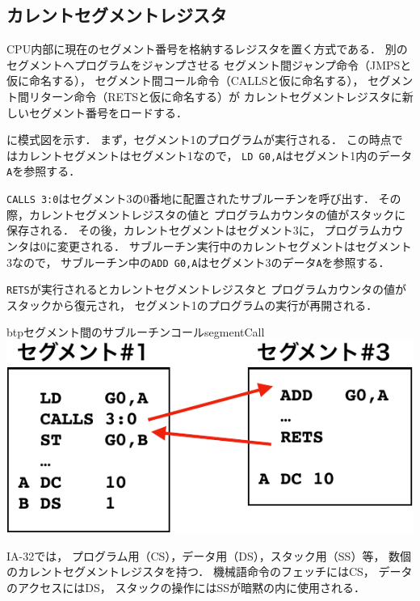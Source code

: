 \subsection{カレントセグメントレジスタ}
CPU内部に現在のセグメント番号を格納するレジスタを置く方式である．
別のセグメントへプログラムをジャンプさせる
セグメント間ジャンプ命令（JMPSと仮に命名する），
セグメント間コール命令（CALLSと仮に命名する），
セグメント間リターン命令（RETSと仮に命名する）が
カレントセグメントレジスタに新しいセグメント番号をロードする．

に模式図を示す．
まず，セグメント1のプログラムが実行される．
この時点ではカレントセグメントはセグメント1なので，
\texttt{LD G0,A}はセグメント1内のデータ\texttt{A}を参照する．

\texttt{CALLS 3:0}はセグメント3の0番地に配置されたサブルーチンを呼び出す．
その際，カレントセグメントレジスタの値と
プログラムカウンタの値がスタックに保存される．
その後，カレントセグメントはセグメント3に，
プログラムカウンタは0に変更される．
サブルーチン実行中のカレントセグメントはセグメント3なので，
サブルーチン中の\texttt{ADD G0,A}はセグメント3のデータ\texttt{A}を参照する．

\texttt{RETS}が実行されるとカレントセグメントレジスタと
プログラムカウンタの値がスタックから復元され，
セグメント1のプログラムの実行が再開される．

\begin{myfig}{btp}{セグメント間のサブルーチンコール}{segmentCall}
  \includegraphics[scale=0.66]{Fig/segmentCall-crop.pdf}
\end{myfig}

IA-32では，
プログラム用（CS），データ用（DS），スタック用（SS）等，
数個のカレントセグメントレジスタを持つ．
機械語命令のフェッチにはCS，
データのアクセスにはDS，
スタックの操作にはSSが暗黙の内に使用される\cite{ia32SegmentReg}．

